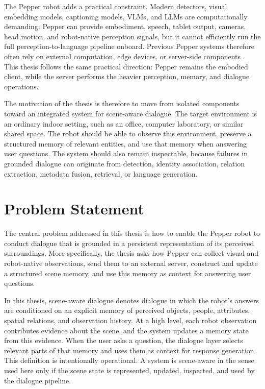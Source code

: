 The Pepper robot adds a practical constraint. Modern detectors, visual embedding models, captioning models, VLMs, and LLMs are computationally demanding. Pepper can provide embodiment, speech, tablet output, cameras, head motion, and robot-native perception signals, but it cannot efficiently run the full perception-to-language pipeline onboard. Previous Pepper systems therefore often rely on external computation, edge devices, or server-side components \cite{reyes_near_2018,trinquet_future_2025,brad_retrieval-augmented_2025,grassi_grounding_2024}. This thesis follows the same practical direction: Pepper remains the embodied client, while the server performs the heavier perception, memory, and dialogue operations.

The motivation of the thesis is therefore to move from isolated components toward an integrated system for scene-aware dialogue. The target environment is an ordinary indoor setting, such as an office, computer laboratory, or similar shared space. The robot should be able to observe this environment, preserve a structured memory of relevant entities, and use that memory when answering user questions. The system should also remain inspectable, because failures in grounded dialogue can originate from detection, identity association, relation extraction, metadata fusion, retrieval, or language generation.

\section{Problem Statement}\label{sec:intro-problem}

The central problem addressed in this thesis is how to enable the Pepper robot to conduct dialogue that is grounded in a persistent representation of its perceived surroundings. More specifically, the thesis asks how Pepper can collect visual and robot-native observations, send them to an external server, construct and update a structured scene memory, and use this memory as context for answering user questions.

In this thesis, scene-aware dialogue denotes dialogue in which the robot's answers are conditioned on an explicit memory of perceived objects, people, attributes, spatial relations, and observation history. At a high level, each robot observation contributes evidence about the scene, and the system updates a memory state from this evidence. When the user asks a question, the dialogue layer selects relevant parts of that memory and uses them as context for response generation. This definition is intentionally operational. A system is scene-aware in the sense used here only if the scene state is represented, updated, inspected, and used by the dialogue pipeline.

